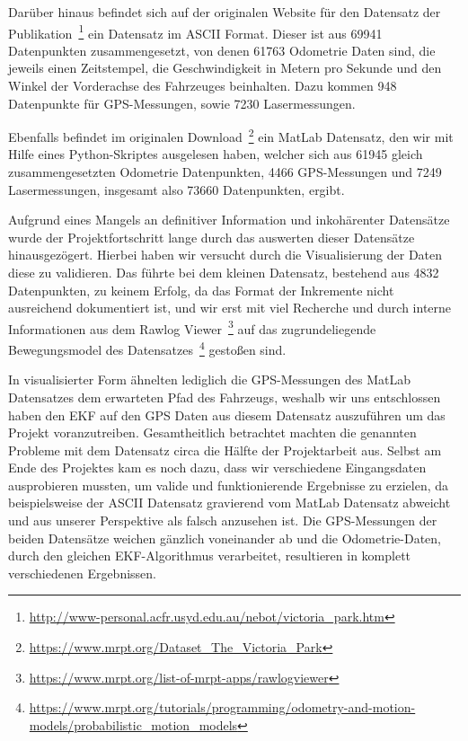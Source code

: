 \documentclass[11pt]{article}
\begin{document}
Darüber hinaus befindet sich auf der originalen Website für den Datensatz der Publikation~\footnote{\url{http://www-personal.acfr.usyd.edu.au/nebot/victoria_park.htm}} ein Datensatz im ASCII Format. Dieser ist aus 69941 Datenpunkten zusammengesetzt, von denen 61763 Odometrie Daten sind, die jeweils einen Zeitstempel, die Geschwindigkeit in Metern pro Sekunde und den Winkel der Vorderachse des Fahrzeuges beinhalten. Dazu kommen 948 Datenpunkte für GPS-Messungen, sowie 7230 Lasermessungen.

Ebenfalls befindet im originalen Download~\footnote{\url{https://www.mrpt.org/Dataset_The_Victoria_Park}} ein MatLab Datensatz, den wir mit Hilfe eines Python-Skriptes ausgelesen haben, welcher sich aus 61945 gleich zusammengesetzten Odometrie Datenpunkten, 4466 GPS-Messungen und 7249 Lasermessungen, insgesamt also 73660 Datenpunkten, ergibt.

Aufgrund eines Mangels an definitiver Information und inkohärenter Datensätze wurde der Projektfortschritt lange durch das auswerten dieser Datensätze hinausgezögert. Hierbei haben wir versucht durch die Visualisierung der Daten diese zu validieren. Das führte bei dem kleinen Datensatz, bestehend aus 4832 Datenpunkten, zu keinem Erfolg, da das Format der Inkremente nicht ausreichend dokumentiert ist, und wir erst mit viel Recherche und durch interne Informationen aus dem Rawlog Viewer~\footnote{\url{https://www.mrpt.org/list-of-mrpt-apps/rawlogviewer}} auf das zugrundeliegende Bewegungsmodel des Datensatzes~\footnote{\url{https://www.mrpt.org/tutorials/programming/odometry-and-motion-models/probabilistic_motion_models}} gestoßen sind.

In visualisierter Form ähnelten lediglich die GPS-Messungen des MatLab Datensatzes dem erwarteten Pfad des Fahrzeugs, weshalb wir uns entschlossen haben den EKF auf den GPS Daten aus diesem Datensatz auszuführen um das Projekt voranzutreiben.
Gesamtheitlich betrachtet machten die genannten Probleme mit dem Datensatz circa die Hälfte der Projektarbeit aus. Selbst am Ende des Projektes kam es noch dazu, dass wir verschiedene Eingangsdaten ausprobieren mussten, um valide und funktionierende Ergebnisse zu erzielen, da beispielsweise der ASCII Datensatz gravierend vom MatLab Datensatz abweicht und aus unserer Perspektive als falsch anzusehen ist. Die GPS-Messungen der beiden Datensätze weichen gänzlich voneinander ab und die Odometrie-Daten, durch den gleichen EKF-Algorithmus verarbeitet, resultieren in komplett verschiedenen Ergebnissen.
\end{document}
